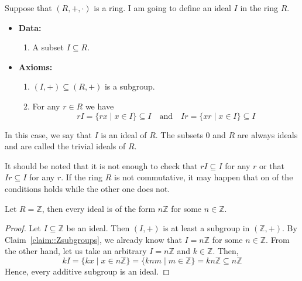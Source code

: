 \begin{definition}
Suppose that $(R, +, \cdot)$ is a ring.
I am going to define an ideal $I$ in the ring $R$.
\begin{itemize}
\item\textbf{Data:} 
\begin{enumerate}
\item A subset $I\subseteq R$.
\end{enumerate}

\item\textbf{Axioms:}
\begin{enumerate}
\item $(I, +)\subseteq (R,+)$ is a subgroup.

\item For any $r\in R$ we have
\[
r I = \{rx\mid x\in I\} \subseteq I\quad\text{and}\quad Ir = \{xr\mid x\in I\}\subseteq I
\]
\end{enumerate}
\end{itemize}
In this case, we say that $I$ is an ideal of $R$.
The subsets $0$ and $R$ are always ideals and are called the trivial ideals of $R$.
\end{definition}

It should be noted that it is not enough to check that $rI \subseteq I$ for any $r$ or that $Ir \subseteq I$ for any $r$.
If the ring $R$ is not commutative, it may happen that on of the conditions holds while the other one does not.


\begin{claim}
\label{claim::ZIdeals}
Let $R = \mathbb Z$, then every ideal is of the form $n\mathbb Z$ for some $n\in \mathbb Z$.
\end{claim}
\begin{proof}
Let $I\subseteq \mathbb Z$ be an ideal.
Then $(I, +)$ is at least a subgroup in $(\mathbb Z, +)$.
By Claim~\ref{claim::Zsubgroups}, we already know that $I = n\mathbb Z$ for some $n\in \mathbb Z$.
From the other hand, let us take an arbitrary $I = n\mathbb Z$ and $k\in \mathbb Z$.
Then,
\[
k I = \{k x \mid x\in n\mathbb Z\} = \{kn m\mid m\in \mathbb Z\} = kn\mathbb Z\subseteq n\mathbb Z
\]
Hence, every additive subgroup is an ideal.
\end{proof}


